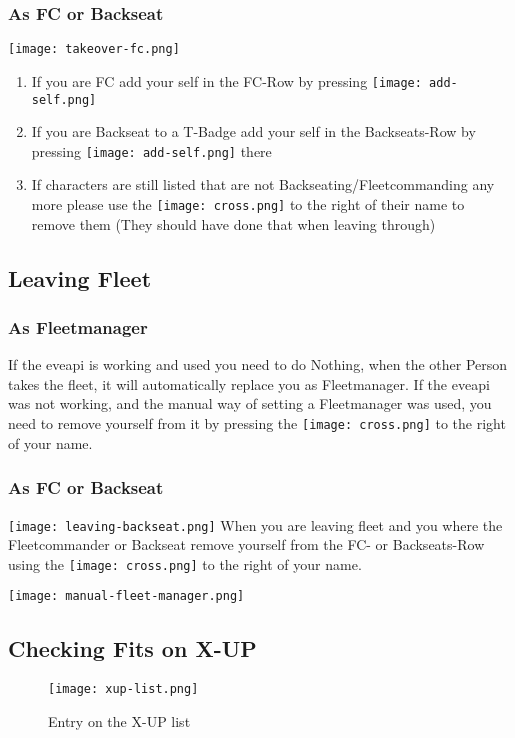 \documentclass[oneside,a4paper]{article}
\newcommand{\piccross}{\texttt{[image: cross.png]}\xspace}
\begin{document}
\subsubsection{As FC or Backseat}
\texttt{[image: takeover-fc.png]}
\begin{enumerate}
	\item If you are FC add your self in the FC-Row by pressing \texttt{[image: add-self.png]}
	\item If you are Backseat to a T-Badge add your self in the Backseats-Row by pressing \texttt{[image: add-self.png]} there
	\item If characters are still listed that are not Backseating/Fleetcommanding any more please use the \piccross to the right of their name to remove them (They should have done that when leaving through)
\end{enumerate}

\subsection{Leaving Fleet}
\subsubsection{As Fleetmanager}
If the eveapi is working and used you need to do Nothing, when the other Person takes the fleet, it will automatically replace you as Fleetmanager.
If the eveapi was not working, and the manual way of setting a Fleetmanager was used, you need to remove yourself from it by pressing the \piccross to the right of your name.

\subsubsection{As FC or Backseat}
\texttt{[image: leaving-backseat.png]}
When you are leaving fleet and you where the Fleetcommander or Backseat remove yourself from the FC- or Backseats-Row using the \piccross to the right of your name.


\texttt{[image: manual-fleet-manager.png]}

\subsection{Checking Fits on X-UP}
\begin{figure}[H]
	\centering
	\caption{Entry on the X-UP list}
	\label{pic:xup-entry}
	\texttt{[image: xup-list.png]}
\end{figure}
\end{document}
